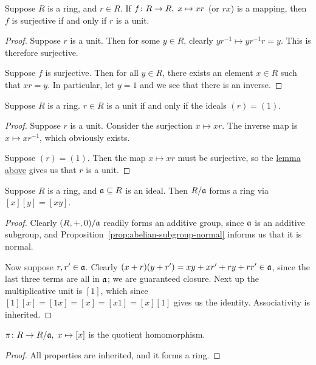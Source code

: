 \begin{lemma}\label{lem:unit-mult-surjective}
    Suppose \(R\) is a ring, and \(r \in R\).
    If \(f\colon R\to R,\;x\mapsto xr\) (or \(rx\)) is a mapping,
    then \(f\) is surjective if and only if \(r\) is a unit.
\end{lemma}
\begin{proof}
    Suppose \(r\) is a unit.
    Then for some \(y \in R\),
    clearly \(yr^{-1} \mapsto yr^{-1}r = y\).
    This is therefore surjective.

    Suppose \(f\) is surjective.
    Then for all \(y \in R\),
    there exists an element \(x \in R\) such that \(xr = y\).
    In particular, let \(y = 1\) and we see that there is an inverse.
\end{proof}
\begin{proposition}\label{prop:unit-one-ideal}
    Suppose \(R\) is a ring.
    \(r \in R\) is a unit if and only if the ideals \((r) = (1)\).
\end{proposition}
\begin{proof}
    Suppose \(r\) is a unit.
    Consider the surjection \(x \mapsto xr\).
    The inverse map is \(x \mapsto xr^{-1}\), which obviously exists.

    Suppose \((r) = (1)\).
    Then the map \(x \mapsto xr\) must be surjective,
    so the \hyperref[lem:unit-mult-surjective]{lemma above} gives us that \(r\) is a unit.
\end{proof}

\begin{lemma}
    Suppose \(R\) is a ring, and \(\mathfrak{a} \subseteq R\) is an ideal.
    Then \(R/\mathfrak{a}\) forms a ring via \([x][y] = [xy]\).
\end{lemma}
\begin{proof}
    Clearly \((R,+,0)/\mathfrak{a}\) readily forms an additive group,
    since \(\mathfrak{a}\) is an additive subgroup,
    and Proposition~\ref{prop:abelian-subgroup-normal}
    informs us that it is normal.

    Now suppose \(r,r' \in \mathfrak{a}\).
    Clearly \((x+r)(y+r') = xy + xr' + ry + rr' \in \mathfrak{a}\),
    since the last three terms are all in \(\mathfrak{a}\);
    we are guaranteed closure.
    Next up the multiplicative unit is \([1]\),
    which since \([1][x] = [1x] = [x] = [x1] = [x][1]\)
    gives us the identity.
    Associativity is inherited.
\end{proof}
\begin{corollary}
    \(\pi\colon R\to R/\mathfrak{a},\;x\mapsto[x]\) is the quotient homomorphism.
\end{corollary}
\begin{proof}
    All properties are inherited, and it forms a ring.
\end{proof}

